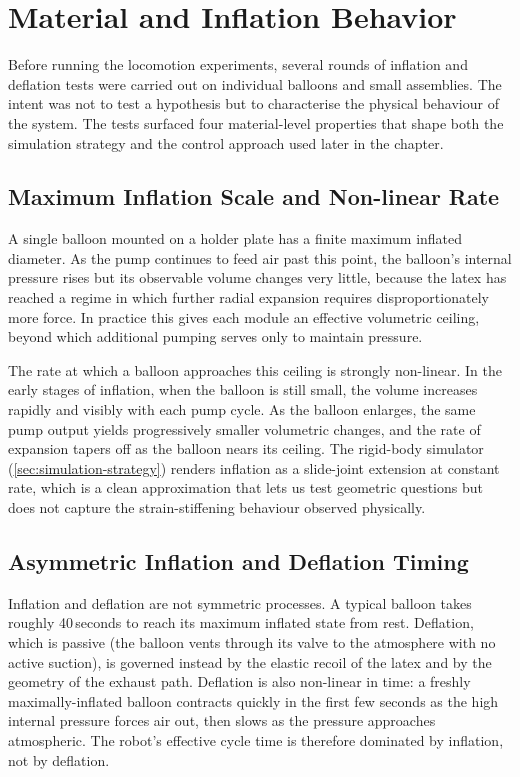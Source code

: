 \section{Material and Inflation Behavior}
\label{sec:material-inflation}

Before running the locomotion experiments, several rounds of inflation and deflation tests were carried out on individual balloons and small assemblies. The intent was not to test a hypothesis but to characterise the physical behaviour of the system. The tests surfaced four material-level properties that shape both the simulation strategy and the control approach used later in the chapter.

\subsection{Maximum Inflation Scale and Non-linear Rate}
\label{subsec:inflation-scale}

A single balloon mounted on a holder plate has a finite maximum inflated diameter. As the pump continues to feed air past this point, the balloon's internal pressure rises but its observable volume changes very little, because the latex has reached a regime in which further radial expansion requires disproportionately more force. In practice this gives each module an effective volumetric ceiling, beyond which additional pumping serves only to maintain pressure.

The rate at which a balloon approaches this ceiling is strongly non-linear. In the early stages of inflation, when the balloon is still small, the volume increases rapidly and visibly with each pump cycle. As the balloon enlarges, the same pump output yields progressively smaller volumetric changes, and the rate of expansion tapers off as the balloon nears its ceiling. The rigid-body simulator (\cref{sec:simulation-strategy}) renders inflation as a slide-joint extension at constant rate, which is a clean approximation that lets us test geometric questions but does not capture the strain-stiffening behaviour observed physically.

\subsection{Asymmetric Inflation and Deflation Timing}
\label{subsec:inflation-timing}

Inflation and deflation are not symmetric processes. A typical balloon takes roughly 40\,seconds to reach its maximum inflated state from rest. Deflation, which is passive (the balloon vents through its valve to the atmosphere with no active suction), is governed instead by the elastic recoil of the latex and by the geometry of the exhaust path. Deflation is also non-linear in time: a freshly maximally-inflated balloon contracts quickly in the first few seconds as the high internal pressure forces air out, then slows as the pressure approaches atmospheric. The robot's effective cycle time is therefore dominated by inflation, not by deflation.

